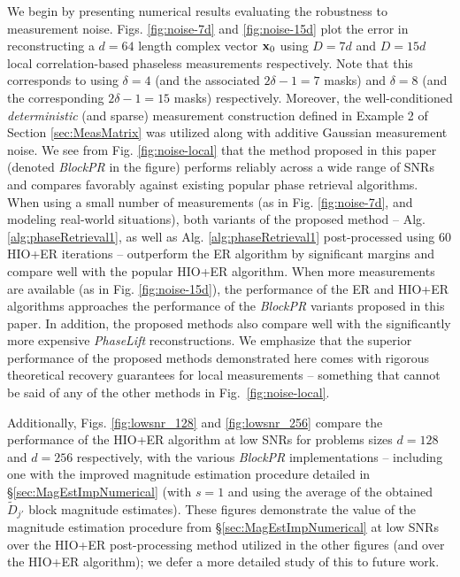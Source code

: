 We begin by presenting numerical results evaluating the robustness to measurement noise.  Figs.
\ref{fig:noise-7d} and \ref{fig:noise-15d} plot the error in reconstructing a $d=64$ length complex
vector $\mathbf x_0$ using $D=7d$ and $D=15d$ local correlation-based phaseless measurements respectively.
Note that this corresponds to using $\delta=4$ (and the associated $2\delta-1=7$ masks) and
$\delta=8$ (and the corresponding $2\delta-1=15$ masks) respectively. Moreover, the well-conditioned
{\em deterministic} (and sparse) measurement construction defined in Example 2 of Section
\ref{sec:MeasMatrix} was utilized along with additive Gaussian measurement noise. We see from Fig.
\ref{fig:noise-local} that the method proposed in this paper (denoted {\em BlockPR} in the figure)
performs reliably across a wide range of SNRs and compares favorably against existing popular phase
retrieval algorithms. When using a small number of measurements (as in Fig.  \ref{fig:noise-7d}, and
modeling real-world situations), both variants of the proposed method -- Alg.
\ref{alg:phaseRetrieval1}, as well as Alg.  \ref{alg:phaseRetrieval1} post-processed using $60$
HIO+ER iterations -- outperform the ER algorithm by significant margins and compare well with the 
popular HIO+ER algorithm. When more measurements are available (as in Fig.
\ref{fig:noise-15d}), the performance of the ER and HIO+ER algorithms approaches the performance of the
{\em BlockPR} variants proposed in this paper. In addition, the proposed methods also compare well
with the significantly more expensive {\em PhaseLift} reconstructions. We emphasize that the
superior performance of the proposed methods demonstrated here comes with rigorous theoretical
recovery guarantees for local measurements -- something that cannot
be said of any of the other methods in Fig.~\ref{fig:noise-local}. 

Additionally, Figs. \ref{fig:lowsnr_128} and \ref{fig:lowsnr_256} compare the performance of the
HIO+ER algorithm at low SNRs for problems sizes $d=128$ and $d=256$ respectively, with the various
{\em BlockPR} implementations -- including one with the improved magnitude estimation procedure
detailed in \S \ref{sec:MagEstImpNumerical} (with $s=1$ and using the average of the obtained
$\tilde D_{j\prime}$ block magnitude estimates). These figures demonstrate the value of the
magnitude estimation procedure from \S \ref{sec:MagEstImpNumerical} at low SNRs over the HIO+ER
post-processing method utilized in the other figures (and over the HIO+ER algorithm); we defer a
more detailed study of this to future work.

